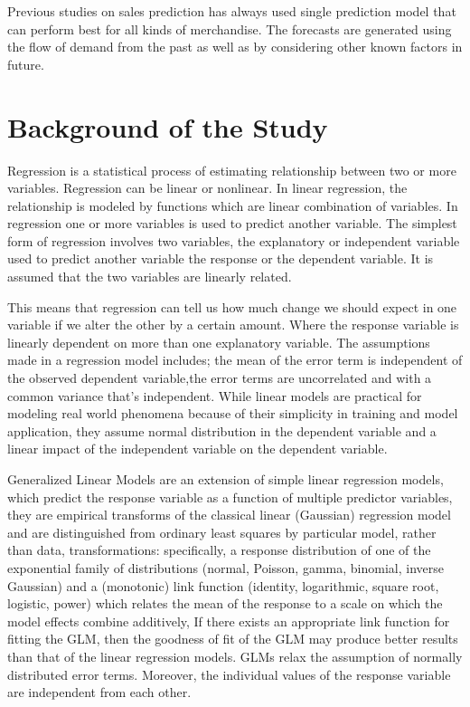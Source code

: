 Previous studies on sales prediction has always used single prediction model that can perform best for all kinds of merchandise. The forecasts are generated using the flow of demand from the past as well as by considering other known factors in future.
\section{Background of the Study}
Regression is a statistical process of estimating relationship between two or more variables. Regression can be linear or nonlinear. In linear regression, the relationship is modeled by functions which are linear combination of variables. In regression one or more variables is used to predict another variable. The simplest form of regression involves two variables, the explanatory or independent variable used to predict another variable the response or the dependent variable. It is assumed that the two variables are linearly related.

This means that regression can tell us how much change we should expect in one variable if we alter the other by a certain amount. Where the response variable is linearly dependent on more than one explanatory variable. The assumptions made in a regression model includes; the mean of the error term is independent of the observed dependent variable,the error terms are uncorrelated and with a common variance that's independent. While linear models are practical for modeling real world phenomena because of their simplicity in training and model application, they assume normal distribution in the dependent variable and a linear impact of the independent variable on the dependent variable.    

Generalized Linear Models are an extension of simple linear regression models, which predict the response variable as a function of multiple predictor variables, they are empirical transforms of the classical linear (Gaussian) regression model and are distinguished from ordinary least squares by particular model, rather than data, transformations: specifically, a response distribution of one of the exponential family of distributions (normal, Poisson, gamma,
binomial, inverse Gaussian) and a (monotonic) link function (identity, logarithmic, square root, logistic, power) which relates the mean of the response to a scale on which the model effects combine additively, If there exists an appropriate link function for fitting the GLM, then the goodness of fit of the GLM may produce better results than that of the linear regression models. GLMs relax the assumption of normally distributed error terms. Moreover, the individual values of the response variable are independent from each other.

